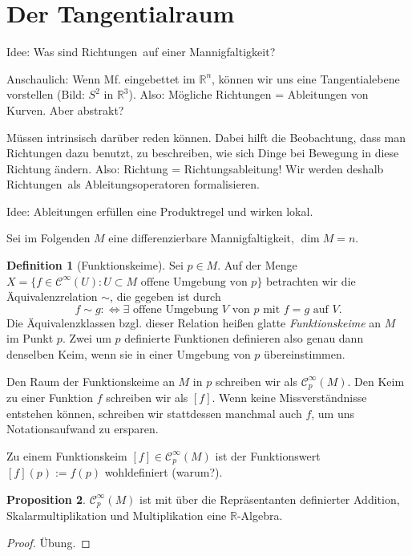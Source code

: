 \documentclass[a4paper]{scrreprt}
\numberwithin{equation}{chapter}
\newcommand{\diff}{:\Longleftrightarrow}
\newcommand{\sC}{\mathcal{C}^{\infty}}
\theoremstyle{definition}
\newtheorem{defn}{Definition}[section]
\newtheorem{prop}[defn]{Proposition}
\newcommand{\bewUeb}{\begin{proof}Übung.\end{proof}}
\begin{document}
\section{Der Tangentialraum}
Idee: Was sind \glqq Richtungen\grqq\ auf einer Mannigfaltigkeit?

Anschaulich: Wenn Mf. eingebettet im $\mathbb R^n$, können wir uns eine Tangentialebene vorstellen (Bild: $S^2$ in $\mathbb R^3$). Also: Mögliche Richtungen = Ableitungen von Kurven. Aber abstrakt?

Müssen intrinsisch darüber reden können. Dabei hilft die Beobachtung, dass man Richtungen dazu benutzt, zu beschreiben, wie sich Dinge bei Bewegung in diese Richtung ändern. Also: Richtung = Richtungsableitung!  Wir werden deshalb \glqq Richtungen\grqq\ als Ableitungsoperatoren formalisieren.

Idee: Ableitungen erfüllen eine Produktregel und wirken \glqq lokal\grqq.

Sei im Folgenden $M$ eine differenzierbare Mannigfaltigkeit, $\dim M = n$.

\begin{defn}[Funktionskeime]
	Sei $p \in M$. Auf der Menge $X = \{f \in \sC(U) : U \subset M \text{ offene Umgebung von } p\}$ betrachten wir die Äquivalenzrelation $\sim$, die gegeben ist durch
	\[f \sim g \diff \exists \text{ offene Umgebung } V \text{ von } p \text{ mit } f = g \text{ auf } V.\]
	Die Äquivalenzklassen bzgl. dieser Relation heißen glatte \emph{Funktionskeime} an $M$ im Punkt $p$. Zwei um $p$ definierte Funktionen definieren also genau dann denselben Keim, wenn sie in einer Umgebung von $p$ übereinstimmen.

	Den Raum der Funktionskeime an $M$ in $p$ schreiben wir als $\sC_p(M)$. Den Keim zu einer Funktion $f$ schreiben wir als $[f]$. Wenn keine Missverständnisse entstehen können, schreiben wir stattdessen manchmal auch $f$, um uns Notationsaufwand zu ersparen.
\end{defn}

Zu einem Funktionskeim $[f] \in \sC_p(M)$ ist der Funktionswert $[f](p) := f(p)$ wohldefiniert (warum?).

\begin{prop}
	$\sC_p(M)$ ist mit über die Repräsentanten definierter Addition, Skalarmultiplikation und Multiplikation eine $\mathbb R$-Algebra. \bewUeb
\end{prop}
\end{document}
